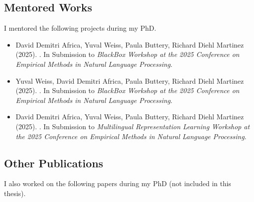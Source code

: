 \newpage

\begin{tcolorbox}[
    enhanced,
    colback=white,
    colframe=thesisblue,
    arc=0mm,
    boxrule=1pt,
    left=10pt,
    right=10pt,
    top=10pt,
    bottom=10pt,
    title=Additional Works,
    fonttitle=\bfseries,
    coltitle=white
]
\subsection*{Mentored Works}
I mentored the following projects during my PhD.

\begin{itemize}
    \item David Demitri Africa, Yuval Weiss, Paula Buttery, Richard Diehl Martinez (2025). {\color{thesisblue}{Learning Dynamics of Meta-Learning in Small Model Pretraining}}. In Submission to \emph{BlackBox Workshop at the 2025 Conference on Empirical Methods in Natural Language Processing}.
    \item Yuval Weiss, David Demitri Africa,  Paula Buttery, Richard Diehl Martinez (2025). {\color{thesisblue}{Investigating ReLoRA: Effects on the Learning Dynamics of Small Language Models}}. In Submission to \emph{BlackBox Workshop at the 2025 Conference on Empirical Methods in Natural Language Processing}.
    \item David Demitri Africa, Yuval Weiss, Paula Buttery, Richard Diehl Martinez (2025). {\color{thesisblue}{Filipino Zero-Shot Transfer Using Meta-Pretraining for Named Entity Recognition}}. In Submission to \emph{Multilingual Representation Learning Workshop at the 2025 Conference on Empirical Methods in Natural Language Processing}.
\end{itemize}

\subsection*{Other Publications}
I also worked on the following papers during my PhD (not included in this thesis).


\end{tcolorbox}
